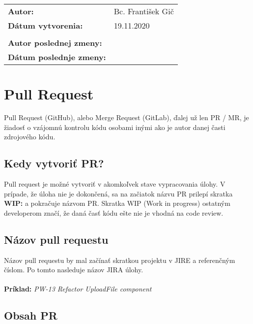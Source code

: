 \documentclass{article}
\begin{document}
    

    \begin{table}[h]
        \begin{tabular}{ll}
            \textbf{Autor:} & Bc. František Gič \\
            \textbf{Dátum vytvorenia:} & 19.11.2020 \\
            \\
            \textbf{Autor poslednej zmeny:} &  \\
            \textbf{Dátum poslednje zmeny:} &  \\
            \hline
        \end{tabular}
        \label{tab:grades}
    \end{table}

    \section*{Pull Request}

    Pull Request (GitHub), alebo Merge Request (GitLab), ďalej už len PR / MR, je žiadosť o vzájomnú kontrolu
    kódu osobami inými ako je autor danej časti zdrojového kódu.

    \subsection*{Kedy vytvoriť PR?}

    Pull request je možné vytvoriť v akomkoľvek stave vypracovania úlohy. V prípade, že úloha nie je dokončená, sa na začiatok
    názvu PR prilepí skratka \textbf{WIP:} a pokračuje názvom PR.
    Skratka WIP (Work in progress) ostatným developerom značí, že daná časť kódu ešte nie je vhodná na code review.

    \subsection*{Názov pull requestu}

    Názov pull requestu by mal začínať skratkou projektu v JIRE a referenčným číslom. Po tomto nasleduje názov JIRA úlohy.\\\\
    \textbf{Príklad:} \emph{PW-13 Refactor UploadFile component}

    \subsection*{Obsah PR}
\end{document}
